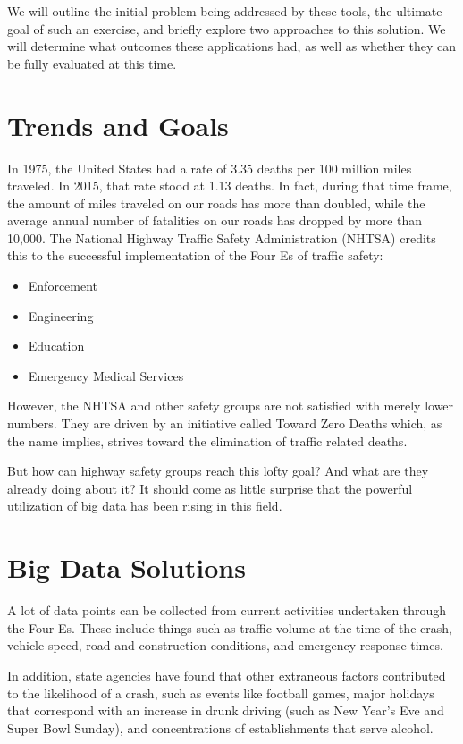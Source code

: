 \documentclass[sigconf]{acmart}
\begin{document}
We will outline the initial problem being addressed by these tools, the ultimate goal of such an exercise, and briefly explore two approaches to this solution. We will determine what outcomes these applications had, as well as whether they can be fully evaluated at this time. 

\section{Trends and Goals}
In 1975, the United States had a rate of 3.35 deaths per 100 million miles traveled.\cite{iihs} In 2015, that rate stood at 1.13 deaths. In fact, during that time frame, the amount of miles traveled on our roads has more than doubled, while the average annual number of fatalities on our roads has dropped by more than 10,000. The National Highway Traffic Safety Administration (NHTSA) credits this to the successful implementation of the Four Es of traffic safety:
\begin{itemize}
    \item Enforcement
    \item Engineering
    \item Education
    \item Emergency Medical Services \cite{gcn}
\end{itemize}
However, the NHTSA and other safety groups are not satisfied with merely lower numbers. They are driven by an initiative called Toward Zero Deaths which, as the name implies, strives toward the elimination of traffic related deaths.\cite{gcn} 

But how can highway safety groups reach this lofty goal? And what are they already doing about it? It should come as little surprise that the powerful utilization of big data has been rising in this field.

\section{Big Data Solutions}
A lot of data points can be collected from current activities undertaken through the Four Es. These include things such as traffic volume at the time of the crash, vehicle speed, road and construction conditions, and emergency response times. \cite{gcn}

In addition, state agencies have found that other extraneous factors contributed to the likelihood of a crash, such as events like football games, major holidays that correspond with an increase in drunk driving (such as New Year's Eve and Super Bowl Sunday), and concentrations of establishments that serve alcohol.\cite{pew} 
\end{document}
